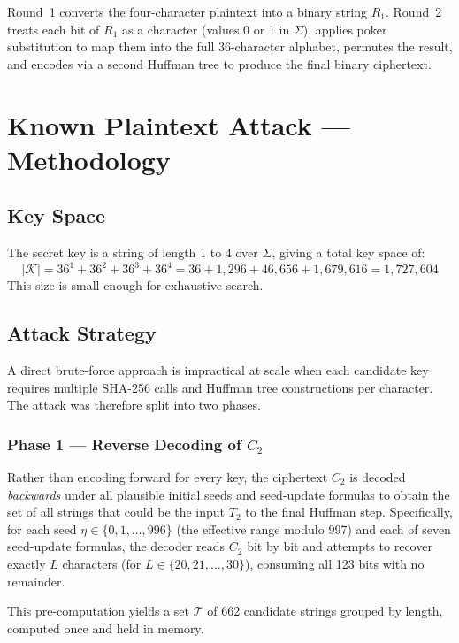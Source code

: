 \documentclass[12pt,a4paper]{article}
\begin{document}
Round~1 converts the four-character plaintext into a binary string $R_1$. Round~2 treats each bit of $R_1$ as a character (values 0 or 1 in $\Sigma$), applies poker substitution to map them into the full 36-character alphabet, permutes the result, and encodes via a second Huffman tree to produce the final binary ciphertext.

\section{Known Plaintext Attack — Methodology}

\subsection{Key Space}

The secret key is a string of length 1 to 4 over $\Sigma$, giving a total key space of:
\[
    |\mathcal{K}| = 36^1 + 36^2 + 36^3 + 36^4 = 36 + 1{,}296 + 46{,}656 + 1{,}679{,}616 = 1{,}727{,}604
\]
This size is small enough for exhaustive search.

\subsection{Attack Strategy}

A direct brute-force approach is impractical at scale when each candidate key requires multiple SHA-256 calls and Huffman tree constructions per character. The attack was therefore split into two phases.

\subsubsection*{Phase 1 — Reverse Decoding of $C_2$}

Rather than encoding forward for every key, the ciphertext $C_2$ is decoded \emph{backwards} under all plausible initial seeds and seed-update formulas to obtain the set of all strings that could be the input $T_2$ to the final Huffman step. Specifically, for each seed $\eta \in \{0, 1, \ldots, 996\}$ (the effective range modulo 997) and each of seven seed-update formulas, the decoder reads $C_2$ bit by bit and attempts to recover exactly $L$ characters (for $L \in \{20, 21, \ldots, 30\}$), consuming all 123 bits with no remainder.

This pre-computation yields a set $\mathcal{T}$ of 662 candidate strings grouped by length, computed once and held in memory.
\end{document}
